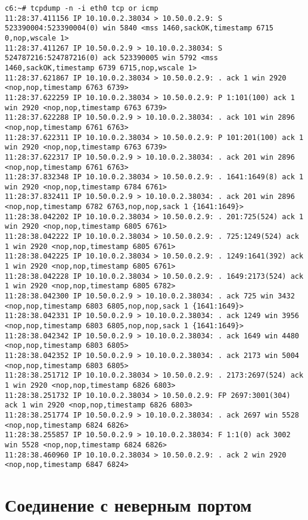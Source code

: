 \documentclass[a4paper,12pt]{article}
\begin{document}
\begin{Verbatim}
c6:~# tcpdump -n -i eth0 tcp or icmp
11:28:37.411156 IP 10.10.0.2.38034 > 10.50.0.2.9: S 523390004:523390004(0) win 5840 <mss 1460,sackOK,timestamp 6715 0,nop,wscale 1>
11:28:37.411267 IP 10.50.0.2.9 > 10.10.0.2.38034: S 524787216:524787216(0) ack 523390005 win 5792 <mss 1460,sackOK,timestamp 6739 6715,nop,wscale 1>
11:28:37.621867 IP 10.10.0.2.38034 > 10.50.0.2.9: . ack 1 win 2920 <nop,nop,timestamp 6763 6739>
11:28:37.622259 IP 10.10.0.2.38034 > 10.50.0.2.9: P 1:101(100) ack 1 win 2920 <nop,nop,timestamp 6763 6739>
11:28:37.622288 IP 10.50.0.2.9 > 10.10.0.2.38034: . ack 101 win 2896 <nop,nop,timestamp 6761 6763>
11:28:37.622311 IP 10.10.0.2.38034 > 10.50.0.2.9: P 101:201(100) ack 1 win 2920 <nop,nop,timestamp 6763 6739>
11:28:37.622317 IP 10.50.0.2.9 > 10.10.0.2.38034: . ack 201 win 2896 <nop,nop,timestamp 6761 6763>
11:28:37.832348 IP 10.10.0.2.38034 > 10.50.0.2.9: . 1641:1649(8) ack 1 win 2920 <nop,nop,timestamp 6784 6761>
11:28:37.832411 IP 10.50.0.2.9 > 10.10.0.2.38034: . ack 201 win 2896 <nop,nop,timestamp 6782 6763,nop,nop,sack 1 {1641:1649}>
11:28:38.042202 IP 10.10.0.2.38034 > 10.50.0.2.9: . 201:725(524) ack 1 win 2920 <nop,nop,timestamp 6805 6761>
11:28:38.042222 IP 10.10.0.2.38034 > 10.50.0.2.9: . 725:1249(524) ack 1 win 2920 <nop,nop,timestamp 6805 6761>
11:28:38.042225 IP 10.10.0.2.38034 > 10.50.0.2.9: . 1249:1641(392) ack 1 win 2920 <nop,nop,timestamp 6805 6761>
11:28:38.042228 IP 10.10.0.2.38034 > 10.50.0.2.9: . 1649:2173(524) ack 1 win 2920 <nop,nop,timestamp 6805 6782>
11:28:38.042300 IP 10.50.0.2.9 > 10.10.0.2.38034: . ack 725 win 3432 <nop,nop,timestamp 6803 6805,nop,nop,sack 1 {1641:1649}>
11:28:38.042331 IP 10.50.0.2.9 > 10.10.0.2.38034: . ack 1249 win 3956 <nop,nop,timestamp 6803 6805,nop,nop,sack 1 {1641:1649}>
11:28:38.042342 IP 10.50.0.2.9 > 10.10.0.2.38034: . ack 1649 win 4480 <nop,nop,timestamp 6803 6805>
11:28:38.042352 IP 10.50.0.2.9 > 10.10.0.2.38034: . ack 2173 win 5004 <nop,nop,timestamp 6803 6805>
11:28:38.251712 IP 10.10.0.2.38034 > 10.50.0.2.9: . 2173:2697(524) ack 1 win 2920 <nop,nop,timestamp 6826 6803>
11:28:38.251732 IP 10.10.0.2.38034 > 10.50.0.2.9: FP 2697:3001(304) ack 1 win 2920 <nop,nop,timestamp 6826 6803>
11:28:38.251774 IP 10.50.0.2.9 > 10.10.0.2.38034: . ack 2697 win 5528 <nop,nop,timestamp 6824 6826>
11:28:38.255857 IP 10.50.0.2.9 > 10.10.0.2.38034: F 1:1(0) ack 3002 win 5528 <nop,nop,timestamp 6824 6826>
11:28:38.460960 IP 10.10.0.2.38034 > 10.50.0.2.9: . ack 2 win 2920 <nop,nop,timestamp 6847 6824>
\end{Verbatim}

\section{Соединение с неверным портом}
\end{document}
